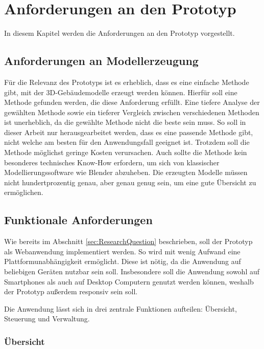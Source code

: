 \newpage
\section{Anforderungen an den Prototyp}\label{sec:Requirements}
In diesem Kapitel werden die Anforderungen an den Prototyp vorgestellt.

\subsection{Anforderungen an Modellerzeugung}

Für die Relevanz des Prototyps ist es erheblich, dass es eine einfache Methode gibt, mit der 3D-Gebäudemodelle erzeugt werden können. Hierfür soll eine Methode gefunden werden, die diese Anforderung erfüllt. Eine tiefere Analyse der gewählten Methode sowie ein tieferer Vergleich zwischen verschiedenen Methoden ist unerheblich, da die gewählte Methode nicht die beste sein muss. So soll in dieser Arbeit nur herausgearbeitet werden, dass es eine passende Methode gibt, nicht welche am besten für den Anwendungsfall geeignet ist. Trotzdem soll die Methode möglichst geringe Kosten verursachen. Auch sollte die Methode kein besonderes technisches Know-How erfordern, um sich von klassischer Modellierungssoftware wie Blender abzuheben. Die erzeugten Modelle müssen nicht hundertprozentig genau, aber genau genug sein, um eine gute Übersicht zu ermöglichen.

\subsection{Funktionale Anforderungen}\label{sec:FunctionalRequirements}
Wie bereits im Abschnitt \ref{sec:ResearchQuestion} beschrieben, soll der Prototyp als Webanwendung implementiert werden. So wird mit wenig Aufwand eine Plattformunabhängigkeit ermöglicht. Diese ist nötig, da die Anwendung auf beliebigen Geräten nutzbar sein soll. Insbesondere soll die Anwendung sowohl auf Smartphones als auch auf Desktop Computern genutzt werden können, weshalb der Prototyp außerdem responsiv sein soll.

Die Anwendung lässt sich in drei zentrale Funktionen aufteilen: Übersicht, Steuerung und Verwaltung.

\subsubsection{Übersicht}

